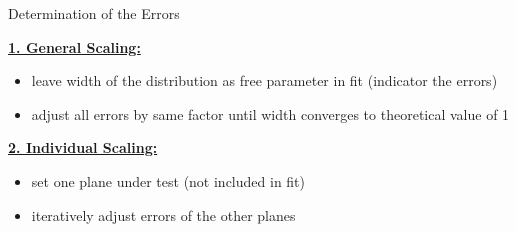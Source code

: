 \begin{frame}{Determination of the Errors}
	
	\textbf{\underline{1. General Scaling:}}\vspace*{1pt}
		\begin{itemize}\itemfill
			\item leave width of the distribution as free parameter in fit (indicator the errors)
			\item adjust all errors by same factor until width converges to theoretical value of 1
		\end{itemize}\vspace*{1ex}
	\textbf{\underline{2. Individual Scaling:}}\vspace*{1pt}
	\begin{itemize}\itemfill
		\item set one plane under test (not included in fit)
		\item iteratively adjust errors of the other planes
	\end{itemize}
	\vspace*{-10pt}
	
\end{frame}

